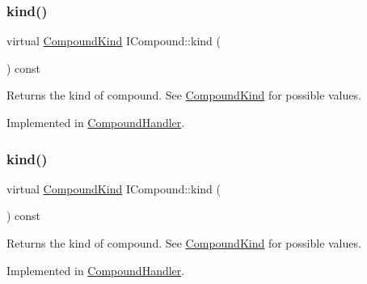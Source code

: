 \mbox{\label{class_i_compound_ad0d6fb22a48b5bbddae2b88a3cab3640}} 
\subsubsection{\texorpdfstring{kind()}{kind()}\hspace{0.1cm}{\footnotesize\ttfamily [1/2]}}
{\footnotesize\ttfamily virtual \mbox{\hyperlink{class_i_compound_a6b86be2ca9f6759434c1dd8405be328a}{Compound\+Kind}} I\+Compound\+::kind (\begin{DoxyParamCaption}{ }\end{DoxyParamCaption}) const\hspace{0.3cm}{\ttfamily [pure virtual]}}

Returns the kind of compound. See \mbox{\hyperlink{class_i_compound_a6b86be2ca9f6759434c1dd8405be328a}{Compound\+Kind}} for possible values. 

Implemented in \mbox{\hyperlink{class_compound_handler_a50629ddd5869657b611c3d170dd39cdb}{Compound\+Handler}}.

\mbox{\label{class_i_compound_ad0d6fb22a48b5bbddae2b88a3cab3640}} 
\subsubsection{\texorpdfstring{kind()}{kind()}\hspace{0.1cm}{\footnotesize\ttfamily [2/2]}}
{\footnotesize\ttfamily virtual \mbox{\hyperlink{class_i_compound_a6b86be2ca9f6759434c1dd8405be328a}{Compound\+Kind}} I\+Compound\+::kind (\begin{DoxyParamCaption}{ }\end{DoxyParamCaption}) const\hspace{0.3cm}{\ttfamily [pure virtual]}}

Returns the kind of compound. See \mbox{\hyperlink{class_i_compound_a6b86be2ca9f6759434c1dd8405be328a}{Compound\+Kind}} for possible values. 

Implemented in \mbox{\hyperlink{class_compound_handler_a50629ddd5869657b611c3d170dd39cdb}{Compound\+Handler}}.

\mbox{\label{class_i_compound_a49a7cb96ed8364494bdb7ecc1abb86c9}} 
